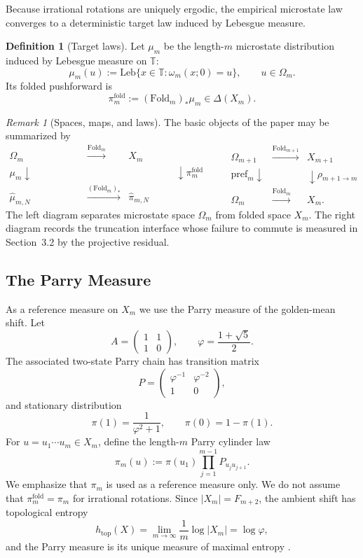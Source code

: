 \documentclass[11pt,letterpaper]{article}
\numberwithin{equation}{section}
\theoremstyle{plain}
\theoremstyle{definition}
\newtheorem{definition}[theorem]{Definition}
\theoremstyle{remark}
\newtheorem{remark}[theorem]{Remark}
\newcommand{\TT}{\mathbb{T}}
\newcommand{\Fold}{\mathrm{Fold}}
\newcommand{\leb}{\mathrm{Leb}}
\newcommand{\pref}{\mathrm{pref}}
\begin{document}
Because irrational rotations are uniquely ergodic, the empirical microstate
law converges to a deterministic target law induced by Lebesgue measure.

\begin{definition}[Target laws]
Let $\mu_m$ be the length-$m$ microstate distribution induced by Lebesgue
measure on $\TT$:
\[
\mu_m(u):=\leb\{x\in\TT:\omega_m(x;0)=u\},\qquad u\in\Omega_m.
\]
Its folded pushforward is
\[
\pi_m^{\mathrm{fold}}:=(\Fold_m)_*\mu_m\in\Delta(X_m).
\]
\end{definition}

\begin{remark}[Spaces, maps, and laws]\label{rem:model-spaces-maps}
The basic objects of the paper may be summarized by
\[
\begin{array}{ccc}
\Omega_m & \xrightarrow{\Fold_m} & X_m\\[0.3em]
\mu_m \downarrow\phantom{(\Fold_m)_*} &  & \phantom{(\Fold_m)_*}\downarrow \pi_m^{\mathrm{fold}}\\[0.3em]
\hat\mu_{m,N} & \xrightarrow{(\Fold_m)_*} & \hat\pi_{m,N}
\end{array}
\qquad
\begin{array}{ccc}
\Omega_{m+1} & \xrightarrow{\Fold_{m+1}} & X_{m+1}\\[0.3em]
\pref_m \downarrow &  & \downarrow \rho_{m+1\to m}\\[0.3em]
\Omega_m & \xrightarrow{\Fold_m} & X_m.
\end{array}
\]
The left diagram separates microstate space \(\Omega_m\) from folded space
\(X_m\). The right diagram records the truncation interface whose failure to
commute is measured in Section~3.2 by the projective residual.
\end{remark}

\subsection{The Parry Measure}

As a reference measure on \(X_m\) we use the Parry measure of the golden-mean
shift. Let
\[
A=\begin{pmatrix}1&1\\1&0\end{pmatrix},\qquad
\varphi=\frac{1+\sqrt5}{2}.
\]
The associated two-state Parry chain has transition matrix
\[
P=\begin{pmatrix}\varphi^{-1} & \varphi^{-2}\\ 1&0\end{pmatrix},
\]
and stationary distribution
\[
\pi(1)=\frac{1}{\varphi^2+1},\qquad
\pi(0)=1-\pi(1).
\]
For $u=u_1\cdots u_m\in X_m$, define the length-$m$ Parry cylinder law
\[
\pi_m(u):=\pi(u_1)\prod_{j=1}^{m-1}P_{u_j u_{j+1}}.
\]
We emphasize that \(\pi_m\) is used as a reference measure only. We do not
assume that \(\pi_m^{\mathrm{fold}}=\pi_m\) for irrational rotations.
Since \(|X_m|=F_{m+2}\), the ambient shift has topological entropy
\[
h_{\mathrm{top}}(X)=\lim_{m\to\infty}\frac1m\log |X_m|=\log\varphi,
\]
and the Parry measure is its unique measure of maximal entropy
\cite{LindMarcus1995,WaltersErgodicTheory}.
\end{document}
